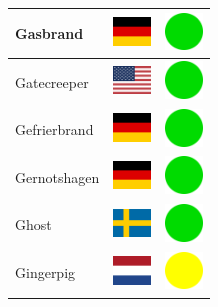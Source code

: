 \documentclass[12pt, a4paper, twoside]{report}
\begin{document}
\begin{center}
\begin{longtable}{|p{5cm}|p{2cm}|p{2cm}|}
 Gasbrand                                                   & \includegraphics[width=1cm]{../4x3/de} &   \includegraphics[width=1cm]{../likes/y} \\ \hline
 Gatecreeper                                                & \includegraphics[width=1cm]{../4x3/us} &   \includegraphics[width=1cm]{../likes/y} \\ \hline
 Gefrierbrand                                               & \includegraphics[width=1cm]{../4x3/de} &   \includegraphics[width=1cm]{../likes/y} \\ \hline
 Gernotshagen                                               & \includegraphics[width=1cm]{../4x3/de} &   \includegraphics[width=1cm]{../likes/y} \\ \hline
 Ghost                                                      & \includegraphics[width=1cm]{../4x3/se} &   \includegraphics[width=1cm]{../likes/y} \\ \hline
 Gingerpig                                                  & \includegraphics[width=1cm]{../4x3/nl} &   \includegraphics[width=1cm]{../likes/m} \\ \hline

\end{longtable}
\end{center}
\end{document}
